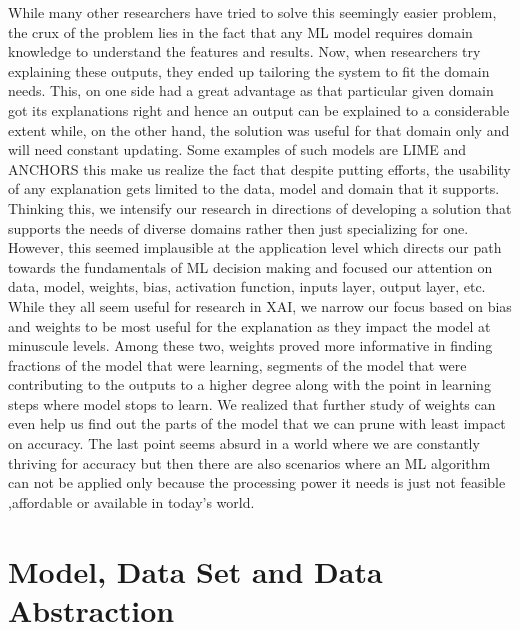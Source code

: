 \documentclass[journal]{vgtc}                %
\begin{document}
While many other researchers have tried to solve this seemingly easier problem, the crux of the problem lies in the fact that any ML model requires domain knowledge to understand the features and results. Now, when researchers try explaining these outputs, they ended up tailoring the system to fit the domain needs. This, on one side had a great advantage as that particular given domain got its explanations right and hence an output can be explained to a considerable extent while, on the other hand, the solution was useful for that domain only and will need constant updating. Some examples of such models are LIME\cite{lime} and ANCHORS\cite{anchors} this make us realize the fact that despite putting efforts, the usability of any explanation gets limited to the data, model and domain that it supports.
Thinking this, we intensify our research in directions of developing a solution that supports the needs of diverse domains rather then just specializing for one. However, this seemed implausible at the application level which directs our path towards the fundamentals of ML decision making and focused our attention on data, model, weights, bias, activation function, inputs layer, output layer, etc. While they all seem useful for research in XAI, we narrow our focus based on bias and weights to be most useful for the explanation as they impact the model at minuscule levels. Among these two, weights proved more informative in finding fractions of the model that were learning, segments of the model that were contributing to the outputs to a higher degree along with the point in learning steps where model stops to learn. We realized that further study of weights can even help us find out the parts of the model that we can prune with least impact on accuracy. The last point seems absurd in a world where we are constantly thriving for accuracy but then there are also scenarios where an ML algorithm can not be applied only because the processing power it needs is just not feasible ,affordable or available in today's world.



\section{Model, Data Set and Data Abstraction}
\end{document}
